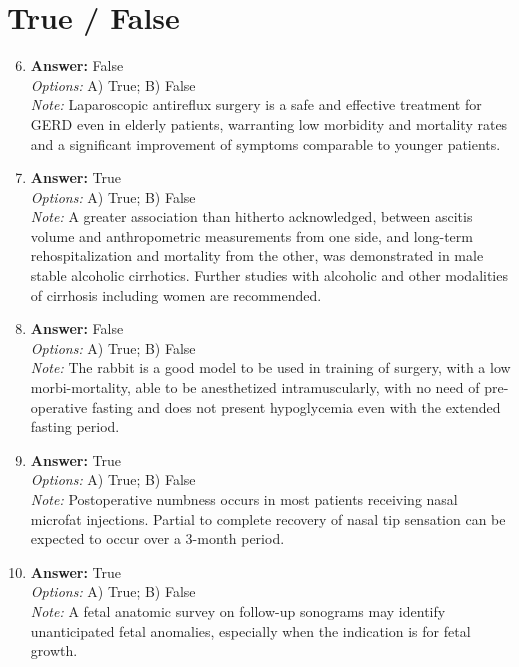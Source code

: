 \documentclass[12pt]{article}
\begin{document}
\section*{True / False}
\begin{enumerate}[label=\arabic*.]
\setcounter{enumi}{5}
\item \textbf{Answer:} False
\\ \textit{Options:} A) True; B) False
\\ \textit{Note:} Laparoscopic antireflux surgery is a safe and effective treatment for GERD even in elderly patients, warranting low morbidity and mortality rates and a significant improvement of symptoms comparable to younger patients.
\item \textbf{Answer:} True
\\ \textit{Options:} A) True; B) False
\\ \textit{Note:} A greater association than hitherto acknowledged, between ascitis volume and anthropometric measurements from one side, and long-term rehospitalization and mortality from the other, was demonstrated in male stable alcoholic cirrhotics. Further studies with alcoholic and other modalities of cirrhosis including women are recommended.
\item \textbf{Answer:} False
\\ \textit{Options:} A) True; B) False
\\ \textit{Note:} The rabbit is a good model to be used in training of surgery, with a low morbi-mortality, able to be anesthetized intramuscularly, with no need of pre-operative fasting and does not present hypoglycemia even with the extended fasting period.
\item \textbf{Answer:} True
\\ \textit{Options:} A) True; B) False
\\ \textit{Note:} Postoperative numbness occurs in most patients receiving nasal microfat injections. Partial to complete recovery of nasal tip sensation can be expected to occur over a 3-month period.
\item \textbf{Answer:} True
\\ \textit{Options:} A) True; B) False
\\ \textit{Note:} A fetal anatomic survey on follow-up sonograms may identify unanticipated fetal anomalies, especially when the indication is for fetal growth.
\end{enumerate}
\end{document}
